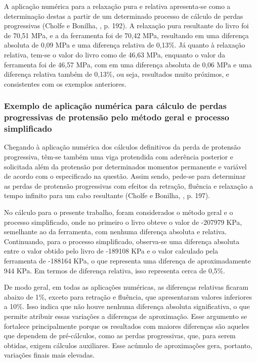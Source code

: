 \hspace{0.4cm}A aplicação numérica para a relaxação pura e relativa apresenta-se como a determinação destas a partir de um determinado processo de cálculo de perdas progressivas (Cholfe e Bonilha, \citeyear{CB}, p. 192). A relaxação pura resultante do livro foi de 70,51 MPa, e a da ferramenta foi de 70,42 MPa, resultando em uma diferença absoluta de 0,09 MPa e uma diferença relativa de 0,13\%. Já quanto à relaxação relativa, tem-se o valor do livro como de 46,63 MPa, enquanto o valor da ferramenta foi de 46,57 MPa, com em uma diferença absoluta de 0,06 MPa e uma diferença relativa também de 0,13\%, ou seja, resultados muito próximos, e consistentes com os exemplos anteriores.

\subsubsection{Exemplo de aplicação numérica para cálculo de perdas progressivas de protensão pelo método geral e processo simplificado}

\hspace{0.4cm}Chegando à aplicação numérica dos cálculos definitivos da perda de protensão progressiva, têm-se também uma viga protendida com aderência posterior e solicitada além da protensão por determinados momentos permanente e variável de acordo com o especificado na questão. Assim sendo, pede-se para determinar as perdas de protensão progressivas com efeitos da retração, fluência e relaxação a tempo infinito para um cabo resultante (Cholfe e Bonilha, \citeyear{CB}, p. 197). 

No cálculo para o presente trabalho, foram considerados o método geral e o processo simplificado, onde no primeiro o livro obteve o valor de -207979 KPa, semelhante ao da ferramenta, com nenhuma diferença absoluta e relativa. Continuando, para o processo simplificado, observa-se uma diferença absoluta entre o valor obtido pelo livro de -189108 KPa e o valor calculado pela ferramenta de -188164 KPa, o que representa uma diferença de aproximadamente 944 KPa. Em termos de diferença relativa, isso representa cerca de 0,5\%.

De modo geral, em todas as aplicações numéricas, as diferenças relativas ficaram abaixo de 1\%, exceto para retração e fluência, que apresentaram valores inferiores a 10\%. Isso indica que não houve nenhuma diferença absoluta significativa, o que permite atribuir essas variações a diferenças de aproximação. Esse argumento se fortalece principalmente porque os resultados com maiores diferenças são aqueles que dependem de pré-cálculos, como as perdas progressivas, que, para serem obtidas, exigem cálculos auxiliares. Esse acúmulo de aproximações gera, portanto, variações finais mais elevadas.


